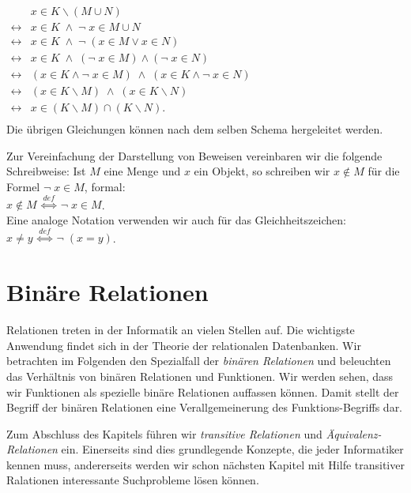 \hspace*{1.3cm} $
\begin{array}{ll}
                & x \in K \backslash (M \cup N)        \\
\leftrightarrow & x \in K \;\wedge\; \neg\; x \in M \cup N \\
\leftrightarrow & x \in K \;\wedge\; \neg\; (x \in M \vee x \in N) \\
\leftrightarrow & x \in K \;\wedge\;  (\neg\; x \in M) \wedge (\neg\; x \in N) \\
\leftrightarrow & (x \in K \wedge \neg\;x \in M) \;\wedge\; (x \in K \wedge \neg\;x \in N) \\
\leftrightarrow & (x \in K \backslash M) \;\wedge\; (x \in K \backslash N) \\
\leftrightarrow & x \in (K \backslash M) \cap (K \backslash N). \\
\end{array}$ \\[0.3cm]
Die übrigen Gleichungen können nach dem selben Schema hergeleitet werden.

\noindent
Zur Vereinfachung der Darstellung von Beweisen vereinbaren wir die folgende Schreibweise:
Ist $M$ eine Menge und $x$ ein Objekt, so schreiben wir $x \notin M$  für
die Formel $\neg\; x \in M$, formal: \\[0.2cm]
\hspace*{1.3cm} $x \notin M \;\stackrel{de\!f}{\Longleftrightarrow}\; \neg\; x \in M$.
\\[0.2cm]
Eine analoge Notation verwenden wir auch für das Gleichheitszeichen:
\\[0.2cm]
\hspace*{1.3cm} 
$x \not= y \;\stackrel{de\!f}{\Longleftrightarrow}\; \neg\; (x = y)$.

\section{Binäre Relationen}
Relationen treten in der Informatik an vielen Stellen auf.  Die wichtigste
Anwendung findet sich in der Theorie der relationalen Datenbanken.
Wir betrachten im Folgenden den Spezialfall der \emph{binären Relationen} und beleuchten
das Verhältnis von binären Relationen und Funktionen. Wir werden sehen, dass wir
Funktionen als spezielle binäre Relationen auffassen können.  Damit stellt der Begriff der
binären Relationen eine Verallgemeinerung des Funktions-Begriffs dar.

Zum Abschluss des Kapitels führen wir \emph{transitive Relationen} und
\emph{Äquivalenz-Relationen} ein.  Einerseits sind dies grundlegende Konzepte, die jeder Informatiker
kennen muss, andererseits werden wir schon nächsten Kapitel mit Hilfe transitiver Ralationen
interessante Suchprobleme lösen können.


